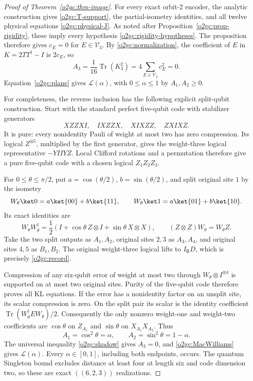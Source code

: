 \begin{proof}[Proof of Theorem~\ref{o2gc:thm-image}]
For every exact orbit-2 encoder, the analytic construction gives
\eqref{o2gc:T-support}, the partial-isometry identities, and all twelve
physical equations \eqref{o2gc:physical-J}. As noted after
Proposition~\ref{o2gc:prop-rigidity}, these imply every hypothesis
\eqref{o2gc:rigidity-hypotheses}. The proposition therefore gives
\(c_E=0\) for \(E\in\mathcal V_3\). By
\eqref{o2gc:normalization}, the coefficient of \(E\) in
\(K=2TT^\dagger-I\) is \(2c_E\), so
\begin{equation}
 A_3=\frac1{16}\operatorname{Tr}(K_3^2)
     =4\sum_{E\in\mathcal V_3}c_E^2=0.
 \label{o2gc:A3-zero}
\end{equation}
Equation~\eqref{o2gc:plane} gives \(\mathcal L(\alpha)\), with
\(0\le\alpha\le1\) by \(A_1,A_2\ge0\).

For completeness, the reverse inclusion has the following explicit
split-qubit construction. Start with the standard perfect five-qubit
code with stabilizer generators
\[
 XZZXI,\quad IXZZX,\quad XIXZZ,\quad ZXIXZ.
\]
It is pure: every nonidentity Pauli of weight at most two has zero
compression. Its logical \(Z^{\otimes5}\), multiplied by the first
generator, gives the weight-three logical representative \(-YIIYZ\).
Local Clifford rotations and a permutation therefore give a pure
five-qubit code with a chosen logical \(Z_1Z_2Z_3\).

For \(0\le\theta\le\pi/2\), put \(a=\cos(\theta/2)\),
\(b=\sin(\theta/2)\), and split original site \(1\) by the isometry
\[
 W_\theta\ket0=a\ket{00}+b\ket{11},\qquad
 W_\theta\ket1=a\ket{01}+b\ket{10}.
\]
Its exact identities are
\begin{equation}
 W_\theta W_\theta^\dagger
 =\frac12(I+\cos\theta\,Z\otimes I+\sin\theta\,X\otimes X),
 \qquad (Z\otimes Z)W_\theta=W_\theta Z.
 \label{o2gc:split-construction}
\end{equation}
Take the two split outputs as \(A_1,A_2\), original sites \(2,3\)
as \(A_3,A_4\), and original sites \(4,5\) as \(B_1,B_2\).
The original weight-three logical lifts to \(I_{\mathsf B}D\),
which is precisely \eqref{o2gc:record}.

Compression of any six-qubit error of weight at most two through
\(W_\theta\otimes I^{\otimes4}\) is supported on at most two original
sites. Purity of the five-qubit code therefore proves all KL equations.
If the error has a nonidentity factor on an unsplit site, its scalar
compression is zero. On the split pair its scalar is the identity
coefficient \(\operatorname{Tr}(W_\theta^\dagger E W_\theta)/2\).
Consequently the only nonzero weight-one and weight-two coefficients
are \(\cos\theta\) on \(Z_{A_1}\) and \(\sin\theta\) on
\(X_{A_1}X_{A_2}\). Thus
\[
 A_1=\cos^2\theta=\alpha,\qquad A_2=\sin^2\theta=1-\alpha.
\]
The universal inequality \eqref{o2gc:shadow} gives \(A_3=0\), and
\eqref{o2gc:MacWilliams} gives \(\mathcal L(\alpha)\). Every
\(\alpha\in[0,1]\), including both endpoints, occurs. The quantum
Singleton bound excludes distance at least four at length six and
code dimension two, so these are exact \(((6,2,3))\) realizations.
\end{proof}

